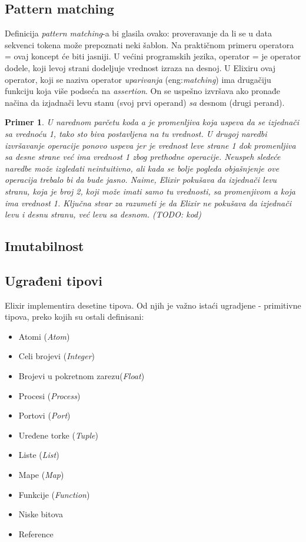 \documentclass[a4paper]{article}
\newtheorem{primer}{Primer}[section]
\begin{document}
\subsection{Pattern matching}
\label{sec:pattern}
Definicija \textit{pattern matching}-a bi glasila ovako: proveravanje da li se u data sekvenci tokena može prepoznati neki šablon. Na praktičnom primeru operatora = ovaj koncept će biti jasniji. 
U većini programskih jezika, operator = je operator dodele, koji levoj strani dodeljuje vrednost izraza na desnoj. U Elixiru ovaj operator, koji se naziva operator \textit{uparivanja} (eng:\textit{matching}) ima drugačiju funkciju koja više podseća na \textit{assertion}. On se uspešno izvršava ako pronađe načina da izjadnači levu stanu (svoj prvi operand) \textit{sa} desnom (drugi perand).
\begin{primer}
U narednom parčetu koda \textit{a} je promenljiva koja uspeva da se izjednači sa vrednoću 1, tako sto biva postavljena na tu vrednost. U drugoj naredbi izvršavanje operacije ponovo uspeva jer je vrednost leve strane 1 dok promenljiva sa desne strane već ima vrednost 1 zbog prethodne operacije. Neuspeh sledeće naredbe može izgledati neintuitivno, ali kada se bolje pogleda objašnjenje ove operacija trebalo bi da bude jasno. Naime, Elixir pokušava da izjednači levu stranu, koja je broj 2, koji može imati samo tu vrednosti, sa promenjivom \textit{a} koja ima vrednost 1. Ključna stvar za razumeti je da Elixir ne pokušava da izjednači levu \textit{i} desnu stranu, već levu \textit{sa} desnom.
(TODO: kod)
\end{primer}
\subsection{Imutabilnost}
\label{sec:tipovi}

\subsection{Ugrađeni tipovi}
\label{sec:tipovi}
Elixir implementira desetine tipova. Od njih je važno istaći ugradjene - primitivne tipova, preko kojih su ostali definisani:
\begin{itemize}
  \item Atomi (\textit{Atom})
  \item Celi brojevi (\textit{Integer})
  \item Brojevi u pokretnom zarezu(\textit{Float})
  \item Procesi (\textit{Process})
  \item Portovi (\textit{Port})
  \item Uređene torke (\textit{Tuple})
  \item Liste (\textit{List})
  \item Mape (\textit{Map})
  \item Funkcije (\textit{Function})
  \item Niske bitova 
  \item Reference
\end{itemize}
\end{document}
